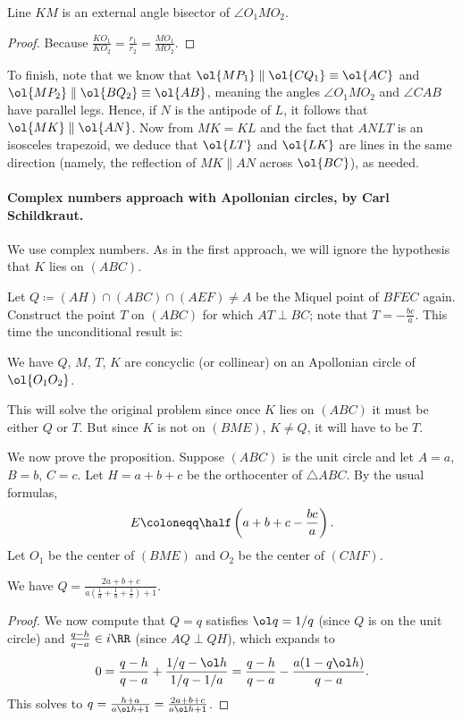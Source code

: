 \documentclass[11pt]{scrartcl}
\begin{document}
\begin{claim*}
  Line $KM$ is an external angle bisector of $\angle O_1MO_2$.
\end{claim*}
\begin{proof}
  Because $\frac{KO_1}{KO_2} = \frac{r_1}{r_2} = \frac{MO_1}{MO_2}$.
\end{proof}

To finish, note that we know that
$\ol{MP_1} \parallel \ol{CQ_1} \equiv \ol{AC}$
and $\ol{MP_2} \parallel \ol{BQ_2} \equiv \ol{AB}$,
meaning the angles $\angle O_1 M O_2$ and $\angle CAB$ have parallel legs.
Hence, if $N$ is the antipode of $L$,
it follows that $\ol{MK} \parallel \ol{AN}$.
Now from $MK = KL$ and the fact that $ANLT$ is an isosceles trapezoid,
we deduce that $\ol{LT}$ and $\ol{LK}$ are lines in the same direction
(namely, the reflection of $MK \parallel AN$ across $\ol{BC}$), as needed.

\paragraph{Complex numbers approach with Apollonian circles, by Carl Schildkraut.}
We use complex numbers.
As in the first approach, we will ignore the hypothesis that $K$ lies on $(ABC)$.

Let $Q \coloneqq (AH) \cap (ABC) \cap (AEF) \neq A$
be the Miquel point of $BFEC$ again.
Construct the point $T$ on $(ABC)$ for which $AT\perp BC$;
note that $T=-\frac{bc}a$.
This time the unconditional result is:
\begin{proposition*}
  We have $Q$, $M$, $T$, $K$ are concyclic (or collinear)
  on an Apollonian circle of $\ol{O_1O_2}$.
\end{proposition*}
This will solve the original problem since once $K$ lies on $(ABC)$
it must be either $Q$ or $T$.
But since $K$ is not on $(BME)$, $K\neq Q$, it will have to be $T$.

We now prove the proposition.
Suppose $(ABC)$ is the unit circle and let $A=a$, $B=b$, $C=c$.
Let $H=a+b+c$ be the orthocenter of $\triangle ABC$.
By the usual formulas,
\[ E \coloneqq \half\left(a+b+c-\frac{bc}{a}\right). \]
Let $O_1$ be the center of $(BME)$ and $O_2$ be the center of $(CMF)$.

\begin{claim*}
  We have $Q = \frac{2a+b+c}{a\left( \frac 1a + \frac 1b + \frac 1c \right)+1}$.
\end{claim*}
\begin{proof}
  We now compute that $Q=q$ satisfies $\ol q=1/q$
  (since $Q$ is on the unit circle)
  and $\frac{q-h}{q-a}\in i\RR$ (since $AQ\perp QH$),
  which expands to
  \[0=\frac{q-h}{q-a}+\frac{1/q-\ol h}{1/q-1/a}
    =\frac{q-h}{q-a}-\frac{a(1-q\ol h)}{q-a}.\]
  This solves to $q=\frac{h+a}{a\ol h+1}=\frac{2a+b+c}{a\ol h+1}$.
\end{proof}
\end{document}
